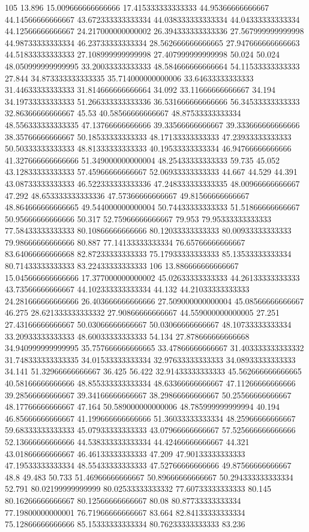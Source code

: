 105 13.896 15.009666666666666 17.415333333333333 44.95366666666667 44.14566666666667 43.672333333333334 44.038333333333334 44.04333333333334 44.12566666666667 24.217000000000002 26.394333333333336 27.567999999999998 44.98733333333334 46.23733333333334 28.562666666666665 27.947666666666663 44.51833333333333 27.108999999999998 27.407999999999998 50.024 50.024 48.050999999999995 33.20033333333333 48.584666666666664 54.11533333333333 27.844 34.873333333333335 35.714000000000006 33.64633333333333 31.44633333333333 31.814666666666664 34.092 33.11666666666667 34.194 34.19733333333333 51.266333333333336 36.531666666666666 56.34533333333333 32.86366666666667 45.53 40.58566666666667 48.87533333333334 48.556333333333335 47.13766666666666 39.33566666666667 39.333666666666666 38.35766666666667 50.18533333333333 48.17133333333333 47.23933333333333 50.50333333333333 48.81333333333333 40.19533333333334 46.94766666666666 41.327666666666666 51.349000000000004 48.25433333333333 59.735 45.052 43.12833333333333 57.45966666666667 52.06933333333333 44.667 44.529 44.391 43.08733333333333 46.522333333333336 47.248333333333335 48.00966666666667 47.292 48.653333333333336 47.57366666666667 49.81566666666667 48.864666666666665 49.544000000000004 50.74433333333333 51.51866666666667 50.95666666666666 50.317 52.75966666666667 79.953 79.95333333333333 77.58433333333333 80.10866666666666 80.12033333333333 80.00933333333333 79.98666666666666 80.887 77.14133333333334 76.65766666666667 83.64066666666668 82.87233333333333 75.17933333333333 85.13533333333334 80.71433333333333 83.22433333333333
106 13.886666666666667 15.045666666666666 17.377000000000002 45.02633333333333 44.26133333333333 43.73566666666667 44.102333333333334 44.132 44.21033333333333 24.281666666666666 26.403666666666666 27.509000000000004 45.08566666666667 46.275 28.621333333333332 27.90866666666667 44.559000000000005 27.251 27.43166666666667 50.03066666666667 50.03066666666667 48.10733333333334 33.20933333333333 48.60033333333333 54.134 27.878666666666668 34.940999999999995 35.757666666666665 33.47866666666667 31.403333333333332 31.748333333333335 34.01533333333334 32.97633333333333 34.08933333333333 34.141 51.32966666666667 36.425 56.422 32.91433333333333 45.562666666666665 40.58166666666666 48.855333333333334 48.63366666666667 47.11266666666666 39.28566666666667 39.34166666666667 38.29866666666667 50.25566666666667 48.17766666666667 47.164 50.589000000000006 48.785999999999994 40.194 46.85666666666667 41.199666666666666 51.36033333333334 48.25966666666667 59.68333333333333 45.07933333333333 43.07966666666667 57.525666666666666 52.13666666666666 44.538333333333334 44.42466666666667 44.321 43.01866666666667 46.46133333333333 47.209 47.90133333333333 47.19533333333334 48.55433333333333 47.52766666666666 49.87566666666667 48.8 49.483 50.733 51.46966666666667 50.89666666666667 50.294333333333334 52.791 80.02199999999999 80.02533333333332 77.60733333333333 80.145 80.16266666666667 80.12566666666667 80.08 80.87733333333334 77.19800000000001 76.71966666666667 83.664 82.84133333333334 75.12866666666666 85.15333333333334 80.76233333333333 83.236

